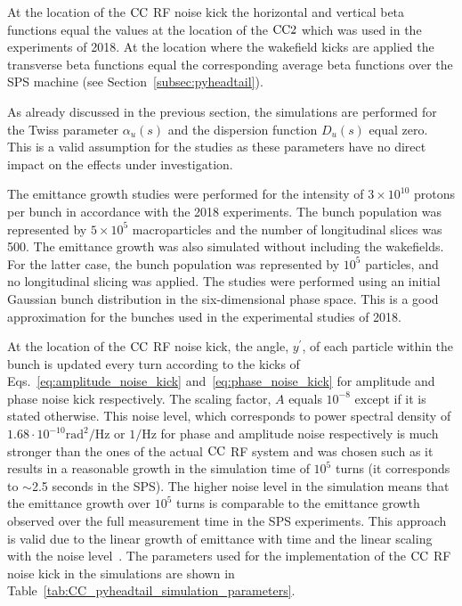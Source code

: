 At the location of the ${\mathrm{CC}}$ RF noise kick the horizontal and vertical beta functions equal the values at the location of the ${\mathrm{CC}}2$ which was used in the experiments of 2018. At the location where the wakefield kicks are applied the transverse beta functions equal the corresponding average beta functions over the SPS machine (see Section~\ref{subsec:pyheadtail}). 

As already discussed in the previous section, the simulations are performed for the Twiss parameter $\alpha_u(s)$ and the dispersion function $D_u(s)$ equal zero. This is a valid assumption for the studies as these parameters have no direct impact on the effects under investigation.

The emittance growth studies were performed for the intensity of $3 \times 10^{10}$ protons per bunch in accordance with the 2018 experiments. The bunch population was represented by $5 \times 10^{5}$ macroparticles and the number of longitudinal slices was 500. The emittance growth was also simulated without including the wakefields. For the latter case, the bunch population was represented by $10^{5}$ particles, and no longitudinal slicing was applied. The studies were performed using an initial Gaussian bunch distribution in the six-dimensional phase space. This is a good approximation for the bunches used in the experimental studies of 2018. 

At the location of the ${\mathrm{CC}}$ RF noise kick, the angle, $y^\prime$, of each particle within the bunch is updated every turn according to the kicks of Eqs.~\eqref{eq:amplitude_noise_kick} and~\eqref{eq:phase_noise_kick} for amplitude and phase noise kick respectively. The scaling factor, $A$ equals $10^{-8}$ except if it is stated otherwise. This noise level, which corresponds to power spectral density of $1.68 \cdot 10^{-10} \mathrm{rad^2/Hz}$ or $\mathrm{1/Hz}$ for phase and amplitude noise respectively is much stronger than the ones of the actual ${\mathrm{CC}}$ RF system and was chosen such as it results in a reasonable growth in the simulation time of $10^5$ turns (it corresponds to $\sim$2.5 seconds in the SPS). The higher noise level in the simulation means that the emittance growth over $10^5$ turns is comparable to the emittance growth observed over the full measurement time in the SPS experiments.
This approach is valid due to the linear growth of emittance with time and the linear scaling with the noise level~\cite{PhysRevSTAB.18.101001}. The parameters used for the implementation of the ${\mathrm{CC}}$ RF noise kick in the simulations are shown in Table~\ref{tab:CC_pyheadtail_simulation_parameters}.

